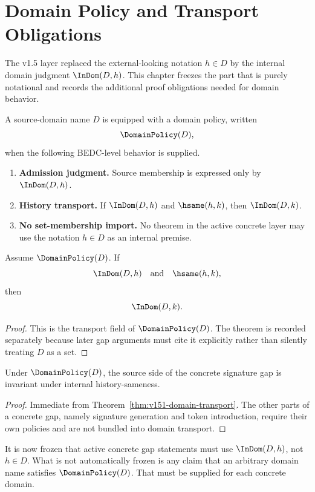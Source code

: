 \chapter{Domain Policy and Transport Obligations}
\label{ch:v151-domain-policy}

The v1.5 layer replaced the external-looking notation \(h\in D\) by the internal domain judgment \(\InDom(D,h)\). This chapter freezes the part that is purely notational and records the additional proof obligations needed for domain behavior.

\begin{definition}
A source-domain name \(D\) is equipped with a domain policy, written
\[
  \DomainPolicy(D),
\]
when the following BEDC-level behavior is supplied.
\begin{enumerate}
  \item \textbf{Admission judgment.} Source membership is expressed only by \(\InDom(D,h)\).
  \item \textbf{History transport.} If \(\InDom(D,h)\) and \(\hsame(h,k)\), then \(\InDom(D,k)\).
  \item \textbf{No set-membership import.} No theorem in the active concrete layer may use the notation \(h\in D\) as an internal premise.
\end{enumerate}
\end{definition}

\begin{theorem}
\label{thm:v151-domain-transport}
Assume \(\DomainPolicy(D)\). If
\[
  \InDom(D,h)
  \quad\text{and}\quad
  \hsame(h,k),
\]
then
\[
  \InDom(D,k).
\]
\end{theorem}

\begin{proof}
This is the transport field of \(\DomainPolicy(D)\). The theorem is recorded separately because later gap arguments must cite it explicitly rather than silently treating \(D\) as a set.
\end{proof}

\begin{corollary}
Under \(\DomainPolicy(D)\), the source side of the concrete signature gap is invariant under internal history-sameness.
\end{corollary}

\begin{proof}
Immediate from Theorem~\ref{thm:v151-domain-transport}. The other parts of a concrete gap, namely signature generation and token introduction, require their own policies and are not bundled into domain transport.
\end{proof}

\begin{remark}
It is now frozen that active concrete gap statements must use \(\InDom(D,h)\), not \(h\in D\). What is not automatically frozen is any claim that an arbitrary domain name satisfies \(\DomainPolicy(D)\). That must be supplied for each concrete domain.
\end{remark}
